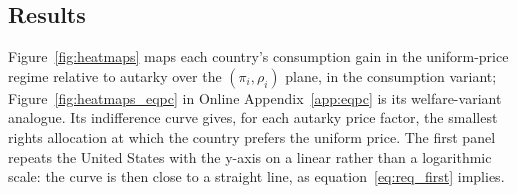 \documentclass[12pt,english]{article}
\theoremstyle{remark}
\begin{document}
\subsection{Results}

Figure~\ref{fig:heatmaps} maps each country's consumption gain in the uniform-price regime relative to autarky over the $(\pi_i,\rho_i)$ plane, in the consumption variant; Figure~\ref{fig:heatmaps_eqpc} in Online Appendix~\ref{app:eqpc} is its welfare-variant analogue. Its indifference curve gives, for each autarky price factor, the smallest rights allocation at which the country prefers the uniform price. The first panel repeats the United States with the y-axis on a linear rather than a logarithmic scale: the curve is then close to a straight line, as equation~\eqref{eq:req_first} implies. %
\end{document}
